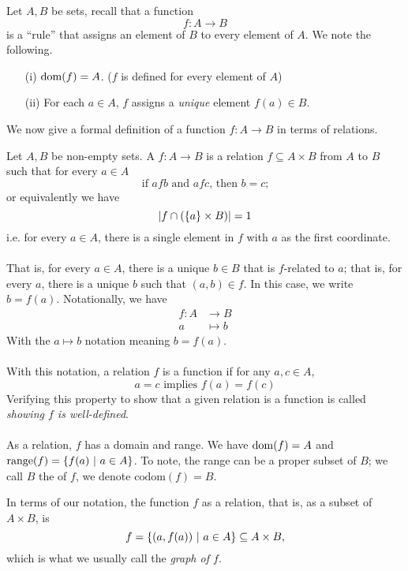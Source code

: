 \vspace*{1em}

\begin{discussion}
Let $A,B$ be sets, recall that a function
\[f: A \to B\]
is a ``rule'' that assigns an element of $B$ to every element of $A$. We note the following.
\begin{itemize}
\item[(i)] $\operatorname{dom}(f) = A$. ($f$ is defined for every element of $A$)
\item[(ii)] For each $a \in A$, $f$ assigns a \emph{unique} element $f(a) \in B$.
\end{itemize}
We now give a formal definition of a function $f:A \to B$ in terms of relations.
\end{discussion}

\vspace*{1em}

\begin{definition}
Let $A,B$ be non-empty sets. A  {\color{blue}$f:A \to B$} is a relation $f \subseteq A \times B$ from $A$ to $B$ such that for every $a \in A$
\[\text{if $afb$ and $afc$, then $b = c$;}\]
or equivalently we have  \[\left\lvert f \cap (\left\{a\right\} \times B)\right\rvert = 1\] i.e. for every $a \in A$, there is a single element in $f$ with $a$ as the first coordinate.\\
\\
That is, for every $a \in A$, there is a unique $b \in B$ that is $f$-related to $a$; that is, for every $a$, there is a unique $b$ such that $(a,b) \in f$. In this case, we write $b = f(a)$. Notationally, we have
\begin{align*}
f: A &\to B\\
 a&\mapsto b
\end{align*}
With the $a \mapsto b$ notation meaning $b = f(a)$.\\
\\
With this notation, a relation $f$ is a function if for any $a,c \in A$,
\[a = c \text{ implies } f(a) = f(c)\]
Verifying this property to show that a given relation is a function is called \emph{showing $f$ is well-defined}.\\
\\
As a relation, $f$ has a domain and range. We have $\operatorname{dom}(f) = A$ and $\operatorname{range}(f) = \left\{f(a)\ \vert\ a \in A\right\}$. To note, the range can be a proper subset of $B$; we call $B$ the  of $f$, we denote $\mathrm{codom}(f) = B$.

\vspace*{0.5em}

\begin{remark}
In terms of our notation, the function $f$ as a relation, that is, as a subset of $A \times B$, is
\[f = \left\{(a,f(a))\ \vert\ a \in A\right\} \subseteq A \times B,\]
which is what we usually call the \emph{graph of $f$}.
\end{remark}
\end{definition}

